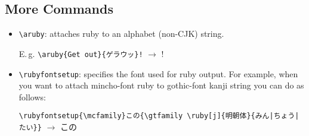 \documentclass[a4paper]{article}
\newcommand{\mcfamily}{\rmfamily}
\newcommand{\gtfamily}{\sffamily}
\newcommand*{\Eg}{E.\,g.\mbox{}}
\begin{document}
\subsection{More Commands}

\begin{itemize}
\item \verb+\aruby+: attaches ruby to an alphabet (non-CJK) string.
\par\noindent\Eg\quad
\verb+\aruby{Get out}{ゲラウッ}!+ $\rightarrow$
  !
\item \verb+\rubyfontsetup+: specifies the font used for ruby output.
For example, when you want to attach mincho-font ruby
to gothic-font kanji string you can do as follows:
\par\noindent
{\small
\verb+\rubyfontsetup{\mcfamily}この{\gtfamily \ruby[j]{明朝体}{みん|ちょう|たい}}+}
$\rightarrow$
{\rubyfontsetup{\mcfamily}この{\gtfamily {}}}
\end{itemize}
\end{document}
